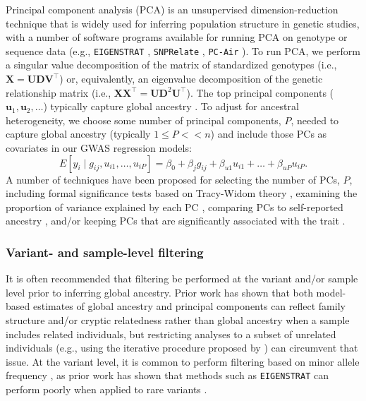 \documentclass[12pt]{article}
\newcommand{\add}[1]{{\color{red}{[... #1 ...]}}}
\begin{document}
Principal component analysis (PCA) is an unsupervised dimension-reduction technique that is widely used for inferring population structure in genetic studies, with a number of software programs available for running PCA on genotype or sequence data (e.g., \texttt{EIGENSTRAT} \citep{eigenstrat}, \texttt{SNPRelate} \citep{snprelate}, \texttt{PC-Air} \citep{conomos2015}).
To run PCA, we perform a singular value decomposition of the matrix of standardized genotypes (i.e., $\mathbf{X} = \mathbf{UDV}^\top$) or, equivalently, an eigenvalue decomposition of the genetic relationship matrix (i.e., $\mathbf{XX}^\top = \mathbf{UD}^2\mathbf{U}^\top$). 
The top principal components ($\mathbf{u}_1, \mathbf{u}_2, \dots$) typically capture global ancestry \citep{patterson2006, mcvean2009}. 
To adjust for ancestral heterogeneity, we choose some number of principal components, $P$, needed to capture global ancestry (typically $1 \le P << n$) and include those PCs as covariates in our GWAS regression models: $$E[y_i \mid g_{ij}, u_{i1}, \dots, u_{iP}] = \beta_0 + \beta_j g_{ij} + \beta_{u 1} u_{i1} + \dots + \beta_{u P} u_{i P}.$$
A number of techniques have been proposed for selecting the number of PCs, $P$, including formal significance tests based on Tracy-Widom theory \citep{patterson2006, eigenstrat}, examining the proportion of variance explained by each PC \citep{reed2015}, comparing PCs to self-reported ancestry \citep{conomos2016}, and/or keeping PCs that are significantly associated with the trait \citep{reiner2012, daya2019}. 

\add{also some people just include how ever many PCs another paper included}

\add{Mention that many people will include more than necessary?}

\add{state what approach we take in this paper to choosing $P$}

\subsubsection{Variant- and sample-level filtering}

It is often recommended that filtering be performed at the variant and/or sample level prior to inferring global ancestry. 
Prior work has shown that both model-based estimates of global ancestry \add{cite Tim's GAW paper} and principal components \citep{conomos2015, eigenstrat, patterson2006} \add{check patterson, maybe add more refs: Price 2010} can reflect family structure and/or cryptic relatedness rather than global ancestry when a sample includes related individuals, but restricting analyses to a subset of unrelated individuals (e.g., using the iterative procedure proposed by \cite{conomos2016related}) can circumvent that issue. 
At the variant level, it is common to perform filtering based on minor allele frequency \add{find references}, as prior work has shown that methods such as \texttt{EIGENSTRAT} can perform poorly when applied to rare variants \citep{kirk2016}.
\end{document}
